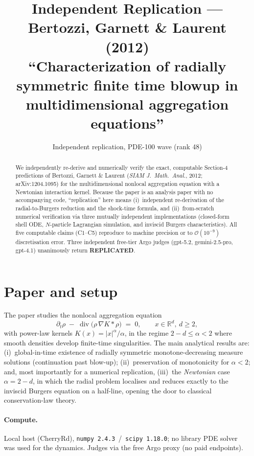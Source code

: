 \documentclass[11pt]{article}
\title{Independent Replication --- Bertozzi, Garnett \& Laurent (2012)\\
\large ``Characterization of radially symmetric finite time blowup in\\
multidimensional aggregation equations''}
\author{Independent replication, PDE-100 wave (rank 48)}
\date{}
\begin{document}
\maketitle

\begin{abstract}
We independently re-derive and numerically verify the exact, computable
Section-4 predictions of Bertozzi, Garnett \& Laurent
(\emph{SIAM J.\ Math.\ Anal.}, 2012; arXiv:1204.1095) for the multidimensional
nonlocal aggregation equation with a Newtonian interaction kernel. Because the
paper is an analysis paper with no accompanying code, ``replication'' here
means (i)~independent re-derivation of the radial-to-Burgers reduction and the
shock-time formula, and (ii)~from-scratch numerical verification via three
mutually independent implementations (closed-form shell ODE, $N$-particle
Lagrangian simulation, and inviscid Burgers characteristics). All five
computable claims (C1--C5) reproduce to machine precision or to
$\mathcal{O}(10^{-9})$ discretisation error. Three independent free-tier Argo
judges (gpt-5.2, gemini-2.5-pro, gpt-4.1) unanimously return
\textbf{REPLICATED}.
\end{abstract}

\section{Paper and setup}
The paper studies the nonlocal aggregation equation
\begin{equation}
\partial_t \rho \;-\; \operatorname{div}\!\bigl(\rho\,\nabla K\!\ast\!\rho\bigr) \;=\; 0,
\qquad x\in\mathbb{R}^d,\ d\ge 2, \label{eq:agg}
\end{equation}
with power-law kernels $K(x)=|x|^\alpha/\alpha$, in the regime
$2-d\le \alpha <2$ where smooth densities develop finite-time singularities.
The main analytical results are: (i)~global-in-time existence of radially
symmetric monotone-decreasing measure solutions (continuation past blow-up);
(ii)~preservation of monotonicity for $\alpha<2$; and, most importantly for a
numerical replication, (iii)~the \emph{Newtonian} case $\alpha=2-d$, in which
the radial problem localises and reduces exactly to the inviscid Burgers
equation on a half-line, opening the door to classical conservation-law
theory.

\paragraph{Compute.}
Local host (CherryRd), \texttt{numpy 2.4.3}~/~\texttt{scipy 1.18.0}; no
library PDE solver was used for the dynamics. Judges via the free Argo proxy
(no paid endpoints).
\end{document}
